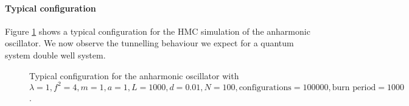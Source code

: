 \documentclass[12pt]{article}
\begin{document}
            \paragraph{Typical configuration}
                Figure \ref{fig:TypicalAnharmonicTrajectory} shows a typical configuration for the HMC simulation of the anharmonic oscillator. We now observe the tunnelling behaviour we expect for a quantum system double well system.
                \begin{figure}
                    \centering
                    \caption{Typical configuration for the anharmonic oscillator with $\lambda = 1, f^2 = 4, m = 1, a = 1, L = 1000, d = 0.01, N = 100, \text{configurations} = 100000, \text{burn period} = 1000$.}
                    \label{fig:TypicalAnharmonicTrajectory}
                \end{figure}
\end{document}
